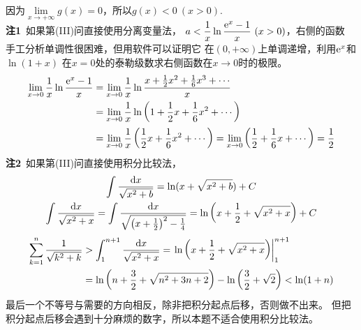\begin{enumerate}[label={【\textbf{例\thechapter.\arabic*}】},
 leftmargin=\inteval{\myenumleftmargin}pt,
 itemsep=\inteval{\myenumitempsep}pt,
 itemindent=\inteval{\myenumitemindent}pt]
因为$ \lim\limits_{x\to+\infty}g(x)=0 $，所以$ g(x)<0\ (x>0) $. \\
\textbf{注1}\ 如果第(III)问直接使用分离变量法，
$ a<\dfrac{1}{x}\ln\dfrac{\e^x-1}{x}\ (x>0) $，右侧的函数
手工分析单调性很困难，但用软件可以证明它
在$ (0,+\infty) $上单调递增，利用$ \mathrm{e}^x $和$ \ln(1+x) $
在$ x=0 $处的泰勒级数求右侧函数在$ x\to 0 $时的极限。
\begin{align*}
    \lim_{x\to 0} \dfrac{1}{x}\ln\dfrac{\mathrm{e}^x-1}{x}  &=
    \lim_{x\to 0} \dfrac{1}{x}\ln\dfrac{x+
        \frac{1}{2}x^2+\frac{1}{6}x^3+\cdots}{x}\\ &=
    \lim_{x\to 0} \dfrac{1}{x}\ln\left(1+
    \frac{1}{2}x+\frac{1}{6}x^2+\cdots\right)\\ &=\lim_{x\to 0} 
    \dfrac{1}{x}\left(\frac{1}{2}x+\frac{1}{6}x^2+\cdots\right) 
    =\lim_{x\to 0}\left(\frac{1}{2}+\frac{1}{6}x+\cdots\right)
    =\dfrac{1}{2}
\end{align*}
\textbf{注2}\ 如果第(III)问直接使用积分比较法，
\begin{gather*}
    \int \dfrac{\mathrm{d} x}{\sqrt{x^2+b}}=\ln(x+\sqrt{x^2+b})+C \\
    \int \dfrac{\mathrm{d} x}{\sqrt{x^2+x}}=
    \int \dfrac{\mathrm{d} x}{\sqrt{\left(x+\frac{1}{2}\right)^2-\frac{1}{4}}}=
    \ln\left(x+\dfrac{1}{2}+\sqrt{x^2+x}\right)+C   
\end{gather*}
\begin{align*}
    \sum_{k=1}^{n}\dfrac{1}{\sqrt{k^2+k}} &>
    \int_1^{n+1}\dfrac{\mathrm{d} x}{\sqrt{x^2+x}} =
    \left.\ln\left(x+\dfrac{1}{2}+\sqrt{x^2+x}\right)\right|_1^{n+1} \\
    & =\ln\left(n+\dfrac{3}{2}+\sqrt{n^2+3n+2}\right)-
    \ln\left(\dfrac{3}{2}+\sqrt{2}\right)<\ln(1+n)
\end{align*}
最后一个不等号与需要的方向相反，除非把积分起点后移，否则做不出来。
但把积分起点后移会遇到十分麻烦的数字，所以本题不适合使用积分比较法。


\end{enumerate}
